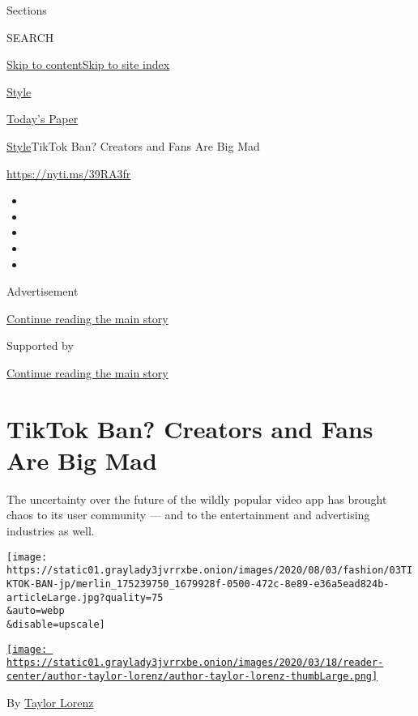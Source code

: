 Sections

SEARCH

\protect\hyperlink{site-content}{Skip to
content}\protect\hyperlink{site-index}{Skip to site index}

\href{https://www.nytimes3xbfgragh.onion/section/style}{Style}

\href{https://myaccount.nytimes3xbfgragh.onion/auth/login?response_type=cookie\&client_id=vi}{}

\href{https://www.nytimes3xbfgragh.onion/section/todayspaper}{Today's
Paper}

\href{/section/style}{Style}\textbar{}TikTok Ban? Creators and Fans Are
Big Mad

\url{https://nyti.ms/39RA3fr}

\begin{itemize}
\item
\item
\item
\item
\item
\end{itemize}

Advertisement

\protect\hyperlink{after-top}{Continue reading the main story}

Supported by

\protect\hyperlink{after-sponsor}{Continue reading the main story}

\hypertarget{tiktok-ban-creators-and-fans-are-big-mad}{%
\section{TikTok Ban? Creators and Fans Are Big
Mad}\label{tiktok-ban-creators-and-fans-are-big-mad}}

The uncertainty over the future of the wildly popular video app has
brought chaos to its user community --- and to the entertainment and
advertising industries as well.

\texttt{[image: https://static01.graylady3jvrrxbe.onion/images/2020/08/03/fashion/03TIKTOK-BAN-jp/merlin\_175239750\_1679928f-0500-472c-8e89-e36a5ead824b-articleLarge.jpg?quality=75\\\&auto=webp\\\&disable=upscale]}

\href{https://www.nytimes3xbfgragh.onion/by/taylor-lorenz}{\texttt{[image: https://static01.graylady3jvrrxbe.onion/images/2020/03/18/reader-center/author-taylor-lorenz/author-taylor-lorenz-thumbLarge.png]}}

By \href{https://www.nytimes3xbfgragh.onion/by/taylor-lorenz}{Taylor
Lorenz}

